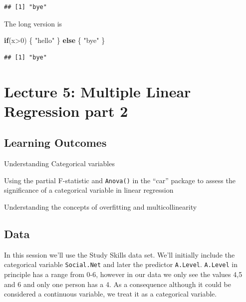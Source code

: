 \documentclass[
]{gitbook}
\newenvironment{Shaded}{\begin{snugshade}}{\end{snugshade}}
\newcommand{\ControlFlowTok}[1]{\textcolor[rgb]{0.13,0.29,0.53}{\textbf{#1}}}
\newcommand{\DecValTok}[1]{\textcolor[rgb]{0.00,0.00,0.81}{#1}}
\newcommand{\NormalTok}[1]{#1}
\newcommand{\SpecialCharTok}[1]{\textcolor[rgb]{0.00,0.00,0.00}{#1}}
\newcommand{\StringTok}[1]{\textcolor[rgb]{0.31,0.60,0.02}{#1}}
\begin{document}
\begin{verbatim}
## [1] "bye"
\end{verbatim}

The long version is

\begin{Shaded}
\begin{Highlighting}[]
\ControlFlowTok{if}\NormalTok{(x}\SpecialCharTok{\textgreater{}}\DecValTok{0}\NormalTok{)}
\NormalTok{\{}
  \StringTok{"hello"}
\NormalTok{\} }\ControlFlowTok{else}\NormalTok{ \{}
  \StringTok{"bye"}
\NormalTok{\}}
\end{Highlighting}
\end{Shaded}

\begin{verbatim}
## [1] "bye"
\end{verbatim}

\hypertarget{lecture-5-multiple-linear-regression-part-2}{%
\section{Lecture 5: Multiple Linear Regression part 2}\label{lecture-5-multiple-linear-regression-part-2}}

\hypertarget{learning-outcomes-7}{%
\subsection{Learning Outcomes}\label{learning-outcomes-7}}

Understanding Categorical variables

Using the partial F-statistic and \texttt{Anova()} in the ``car'' package to assess the significance of a categorical variable in linear regression

Understanding the concepts of overfitting and multicollinearity

\hypertarget{data-3}{%
\subsection{Data}\label{data-3}}

In this session we'll use the Study Skills data set. We'll initially include the categorical variable \texttt{Social.Net} and later the predictor \texttt{A.Level}. \texttt{A.Level} in principle has a range from 0-6, however in our data we only see the values 4,5 and 6 and only one person has a 4. As a consequence although it could be considered a continuous variable, we treat it as a categorical variable.
\end{document}

